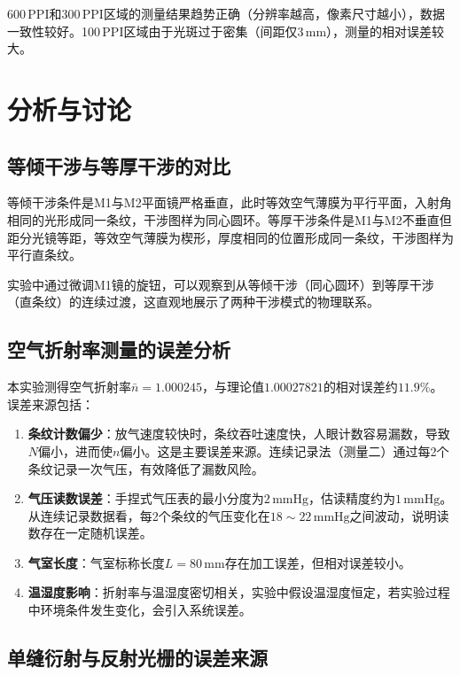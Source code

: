 \documentclass[UTF8]{article}
\begin{document}
600\,PPI和300\,PPI区域的测量结果趋势正确（分辨率越高，像素尺寸越小），数据一致性较好。100\,PPI区域由于光斑过于密集（间距仅3\,mm），测量的相对误差较大。

\section{分析与讨论}

\subsection{等倾干涉与等厚干涉的对比}

等倾干涉条件是M1与M2平面镜严格垂直，此时等效空气薄膜为平行平面，入射角相同的光形成同一条纹，干涉图样为同心圆环。等厚干涉条件是M1与M2不垂直但距分光镜等距，等效空气薄膜为楔形，厚度相同的位置形成同一条纹，干涉图样为平行直条纹。

实验中通过微调M1镜的旋钮，可以观察到从等倾干涉（同心圆环）到等厚干涉（直条纹）的连续过渡，这直观地展示了两种干涉模式的物理联系。

\subsection{空气折射率测量的误差分析}

本实验测得空气折射率$\bar{n} = 1.000245$，与理论值$1.00027821$的相对误差约$11.9\%$。误差来源包括：

\begin{enumerate}
    \item \textbf{条纹计数偏少}：放气速度较快时，条纹吞吐速度快，人眼计数容易漏数，导致$N$偏小，进而使$n$偏小。这是主要误差来源。连续记录法（测量二）通过每2个条纹记录一次气压，有效降低了漏数风险。
    \item \textbf{气压读数误差}：手捏式气压表的最小分度为$2\,\mathrm{mmHg}$，估读精度约为$1\,\mathrm{mmHg}$。从连续记录数据看，每2个条纹的气压变化在$18\sim22\,\mathrm{mmHg}$之间波动，说明读数存在一定随机误差。
    \item \textbf{气室长度}：气室标称长度$L=80\,\mathrm{mm}$存在加工误差，但相对误差较小。
    \item \textbf{温湿度影响}：折射率与温湿度密切相关，实验中假设温湿度恒定，若实验过程中环境条件发生变化，会引入系统误差。
\end{enumerate}

\subsection{单缝衍射与反射光栅的误差来源}
\end{document}
